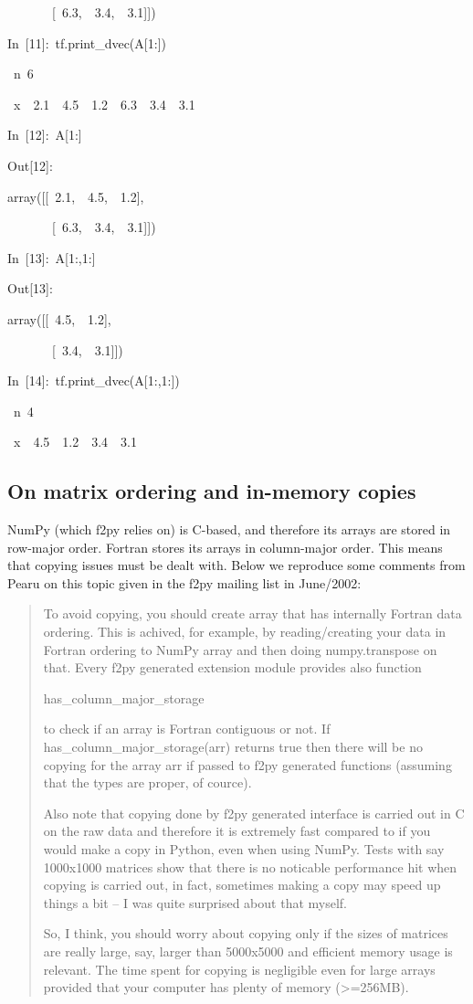 \begin{lyxcode}
~~~~~~~{[}~6.3,~~3.4,~~3.1]])

In~{[}11]:~tf.print\_dvec(A{[}1:])

~n~6

~x~~2.1~~4.5~~1.2~~6.3~~3.4~~3.1

In~{[}12]:~A{[}1:]

Out{[}12]:

array({[}{[}~2.1,~~4.5,~~1.2],

~~~~~~~{[}~6.3,~~3.4,~~3.1]])

In~{[}13]:~A{[}1:,1:]

Out{[}13]:

array({[}{[}~4.5,~~1.2],

~~~~~~~{[}~3.4,~~3.1]])

In~{[}14]:~tf.print\_dvec(A{[}1:,1:])

~n~4

~x~~4.5~~1.2~~3.4~~3.1
\end{lyxcode}

\subsection{On matrix ordering and in-memory copies}

NumPy (which f2py relies on) is C-based, and therefore its arrays
are stored in row-major order. Fortran stores its arrays in column-major
order. This means that copying issues must be dealt with. Below we
reproduce some comments from Pearu on this topic given in the f2py
mailing list in June/2002: 

\begin{quote}
To avoid copying, you should create array that has internally Fortran
data ordering. This is achived, for example, by reading/creating your
data in Fortran ordering to NumPy array and then doing numpy.transpose
on that. Every f2py generated extension module provides also function 

has\_column\_major\_storage

to check if an array is Fortran contiguous or not. If has\_column\_major\_storage(arr)
returns true then there will be no copying for the array arr if passed
to f2py generated functions (assuming that the types are proper, of
cource).

Also note that copying done by f2py generated interface is carried
out in C on the raw data and therefore it is extremely fast compared
to if you would make a copy in Python, even when using NumPy. Tests
with say 1000x1000 matrices show that there is no noticable performance
hit when copying is carried out, in fact, sometimes making a copy
may speed up things a bit -- I was quite surprised about that myself.

So, I think, you should worry about copying only if the sizes of matrices
are really large, say, larger than 5000x5000 and efficient memory
usage is relevant. The time spent for copying is negligible even for
large arrays provided that your computer has plenty of memory (>=256MB).
\end{quote}


